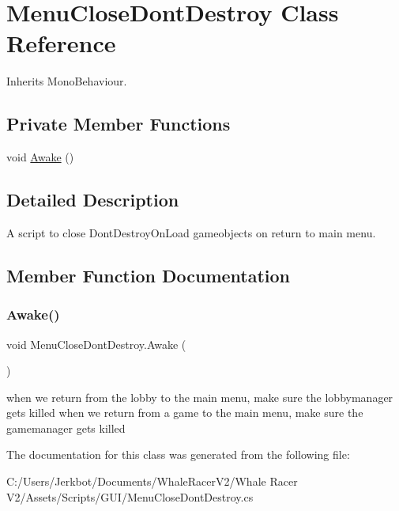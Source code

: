 \hypertarget{class_menu_close_dont_destroy}{}\section{Menu\+Close\+Dont\+Destroy Class Reference}
\label{class_menu_close_dont_destroy}


Inherits Mono\+Behaviour.

\subsection*{Private Member Functions}
\begin{DoxyCompactItemize}
\item 
void \hyperlink{class_menu_close_dont_destroy_ad32c8cc24d168bbddc73301c3d84da9a}{Awake} ()
\end{DoxyCompactItemize}


\subsection{Detailed Description}
A script to close Dont\+Destroy\+On\+Load gameobjects on return to main menu. 



\subsection{Member Function Documentation}
\mbox{\label{class_menu_close_dont_destroy_ad32c8cc24d168bbddc73301c3d84da9a}} 
\subsubsection{\texorpdfstring{Awake()}{Awake()}}
{\footnotesize\ttfamily void Menu\+Close\+Dont\+Destroy.\+Awake (\begin{DoxyParamCaption}{ }\end{DoxyParamCaption})\hspace{0.3cm}{\ttfamily [private]}}



when we return from the lobby to the main menu, make sure the lobbymanager gets killed when we return from a game to the main menu, make sure the gamemanager gets killed 



The documentation for this class was generated from the following file\+:\begin{DoxyCompactItemize}
\item 
C\+:/\+Users/\+Jerkbot/\+Documents/\+Whale\+Racer\+V2/\+Whale Racer V2/\+Assets/\+Scripts/\+G\+U\+I/Menu\+Close\+Dont\+Destroy.\+cs\end{DoxyCompactItemize}
